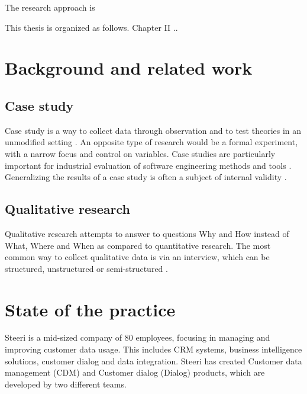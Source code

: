 \documentclass[english]{tktltiki2}
\theoremstyle{definition}
\theoremstyle{remark}
\begin{document}
The research approach is %

This thesis is organized as follows. Chapter II ..
%

\section{Background and related work}

\subsection{Case study}
Case study is a way to collect data through observation and to test theories in an unmodified setting \cite{zelkowitz1998experimental}. An opposite type of research would be a formal experiment, with a narrow focus and control on variables. Case studies are particularly important for industrial evaluation of software engineering methods and tools \cite{kitchenham1995case}. Generalizing the results of a case study is often a subject of internal validity \cite{TODO}. 

\subsection{Qualitative research}
Qualitative research attempts to answer to questions Why and How instead of What, Where and When as compared to quantitative research. The most common way to collect qualitative data is via an interview, which can be structured, unstructured or semi-structured \cite{Qualitative Methods in Empirical Studies of Software Engineering}. 

\section{State of the practice}	
Steeri is a mid-sized company of 80 employees, focusing in managing and improving customer data usage. This includes CRM systems, business intelligence solutions, customer dialog and data integration. Steeri has created Customer data management (CDM) and Customer dialog (Dialog) products, which are developed by two different teams. 
\end{document}
